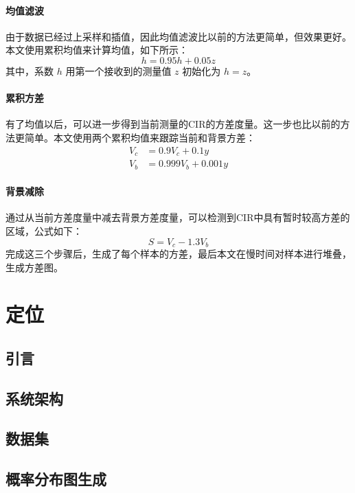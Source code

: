 \subsubsection{均值滤波}
由于数据已经过上采样和插值，因此均值滤波比以前\cite{Ledergerber}的方法更简单，但效果更好。本文使用累积均值来计算均值，如下所示：
\begin{equation}
    h = 0.95h + 0.05z
\end{equation}
其中，系数 \( h \) 用第一个接收到的测量值 \( z \) 初始化为 \( h = z \)。

\subsubsection{累积方差}
有了均值以后，可以进一步得到当前测量的CIR的方差度量。这一步也比以前\cite{Ledergerber}的方法更简单。本文使用两个累积均值来跟踪当前和背景方差：
\begin{align}
    V_c &= 0.9V_c + 0.1y \\
    V_b &= 0.999V_b + 0.001y
\end{align}

\subsubsection{背景减除}
通过从当前方差度量中减去背景方差度量，可以检测到CIR中具有暂时较高方差的区域，公式如下：
\begin{equation}
    S = V_c - 1.3V_b
\end{equation}
完成这三个步骤后，生成了每个样本的方差，最后本文在慢时间对样本进行堆叠，生成方差图。


\chapter{定位}
\section{引言}

\section{系统架构}

\section{数据集}

\section{概率分布图生成}

